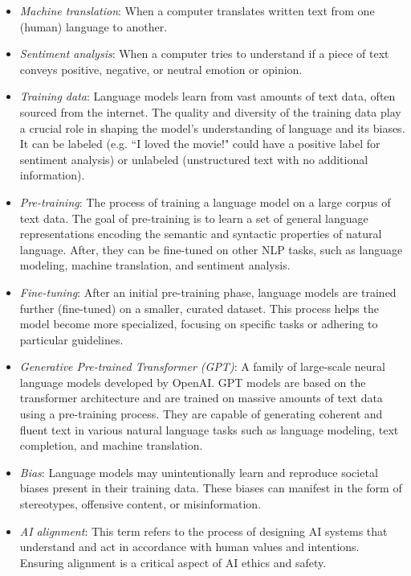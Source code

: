 \documentclass[12pt]{article}
\begin{document}
\begin{itemize}
    \item \textit{Machine translation}\label{item:machine-translation}: When a computer translates written text from one (human) language to another.
    
    \item \textit{Sentiment analysis}\label{item:sentiment-analysis}: When a computer tries to understand if a piece of text conveys positive, negative, or neutral emotion or opinion.

    \item \textit{Training data}\label{item:training}: Language models learn from vast amounts of text data, often sourced from the internet. The quality and diversity of the training data play a crucial role in shaping the model's understanding of language and its biases. It can be labeled (e.g. ``I loved the movie!" could have a positive label for sentiment analysis) or unlabeled (unstructured text with no additional information).
    
    \item \textit{Pre-training}\label{item:pre-training}: The process of training a language model on a large corpus of text data. The goal of pre-training is to learn a set of general language representations encoding the semantic and syntactic properties of natural language.  After, they can be fine-tuned on other NLP tasks, such as language modeling, machine translation, and sentiment analysis.
    
    \item \textit{Fine-tuning}\label{item:finetuning}: After an initial pre-training phase, language models are trained further (fine-tuned) on a smaller, curated dataset. This process helps the model become more specialized, focusing on specific tasks or adhering to particular guidelines.
    
    \item\textit{Generative Pre-trained Transformer (GPT)}\label{item:gpt}: A family of large-scale neural language models developed by OpenAI. GPT models are based on the transformer architecture and are trained on massive amounts of text data using a pre-training process. They are capable of generating coherent and fluent text in various natural language tasks such as language modeling, text completion, and machine translation. 
    
    \item \textit{Bias}\label{item:bias}: Language models may unintentionally learn and reproduce societal biases present in their training data. These biases can manifest in the form of stereotypes, offensive content, or misinformation.
    \item \textit{AI alignment}\label{item:alignment}: This term refers to the process of designing AI systems that understand and act in accordance with human values and intentions. Ensuring alignment is a critical aspect of AI ethics and safety.
    

\end{itemize}
\end{document}
